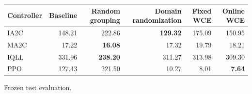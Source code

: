 \begin{tabular}{lrrrrr}
\hline
Controller & Baseline & Random grouping & Domain randomization & Fixed WCE & Online WCE \\
\hline
IA2C & 148.21 & 222.86 & \textbf{129.32} & 175.09 & 150.95 \\
MA2C & 17.22 & \textbf{16.08} & 17.32 & 19.79 & 18.21 \\
IQLL & 331.96 & \textbf{238.20} & 311.27 & 313.98 & 309.30 \\
PPO & 127.43 & 221.50 & 10.27 & 8.01 & \textbf{7.64} \\
\hline
\end{tabular}
Frozen test evaluation.
